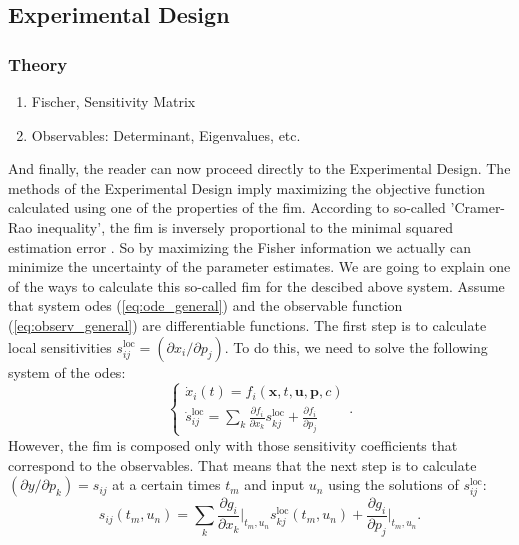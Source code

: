 \documentclass[10pt,A4paper]{article}
\newcommand{\mbx}{\mathbf{x}}
\newcommand{\mbu}{\mathbf{u}}
\newcommand{\mbp}{\mathbf{p}}
\begin{document}
\subsection*{Experimental Design}
\subsubsection*{Theory}
\begin{enumerate}
    \item Fischer, Sensitivity Matrix
    \item Observables: Determinant, Eigenvalues, etc.
\end{enumerate}


And finally, the reader can now proceed directly to the Experimental Design.
The methods of the Experimental Design imply maximizing the objective function calculated using one of the properties of the \ac{fim}.
According to so-called 'Cramer-Rao inequality', the \acl{fim} is inversely proportional to the minimal squared estimation error \cite{friedenExploratoryData2010}. 
So by maximizing the Fisher information we actually can minimize the uncertainty of the parameter estimates.
We are going to explain one of the ways to calculate this so-called \acl{fim} for the descibed above system.
Assume that system \acp{ode} (\ref{eq:ode_general}) and the observable function (\ref{eq:observ_general}) are differentiable functions.
The first step is to calculate local sensitivities $s^\text{loc}_{ij} = (\partial x_i / \partial p_j )$.
To do this, we need to solve the following system of the \acp{ode}:
\begin{equation}
    \begin{cases}
    \dot x_i (t) = f_i(\mbx, t, \mbu, \mbp, c)\\
    \dot s^\text{loc}_{ij} = \sum_k \frac{\partial f_i}{\partial x_k} s^\text{loc}_{kj} + \frac{\partial f_i}{\partial p_j}
    \end{cases}.
\label{eq:ode_and_sensitiv}
\end{equation} 
However, the \ac{fim} is composed only with those sensitivity coefficients that correspond to the observables.
That means that the next step is to calculate $(\partial y / \partial p_k) = s_{ij}$ at a certain times $t_m$ and input $u_n$ using the solutions of $s^\text{loc}_{ij}$:
\begin{equation}
    s_{ij} (t_m, u_n) = \sum_k \frac{\partial g_i}{\partial x_k}\bigg|_{t_m, u_n} s_{kj}^\text{loc} (t_m, u_n) + \frac{\partial g_i}{\partial p_j}\bigg|_{t_m, u_n}.
\label{eq:observ_sensitivities}
\end{equation}
\end{document}
